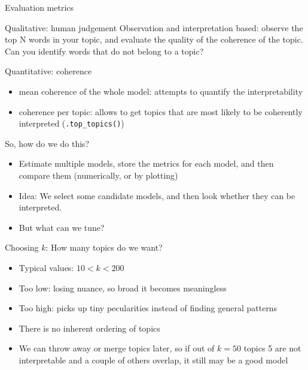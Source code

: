 \begin{frame}{Evaluation metrics}
	\begin{block}{Qualitative: human judgement}
		Observation and interpretation based: observe the top N words in your topic, and evaluate the quality of the coherence of the topic.  Can you identify words that do not belong to a topic?
	\end{block}
	
	\pause 
	\begin{block}{Quantitative: coherence}
		\begin{itemize}
			\item mean coherence of the whole model: attempts to quantify the interpretability
			\item coherence per topic: allows to get topics that are most likely to be coherently interpreted (\texttt{.top\_topics()})
		\end{itemize}
	\end{block}
	
\end{frame}


\begin{frame}{So, how do we do this?}
	\begin{itemize}[<+->]
		\item Estimate multiple models, store the metrics for each model, and then compare them (numerically, or by plotting)
		\item Idea: We select some candidate models, and then look whether they can be interpreted.
		\item But what can we tune?
	\end{itemize}
\end{frame}


\begin{frame}{Choosing $k$: How many topics do we want?}
	\begin{itemize}
		\item Typical values: $10<k<200$
		\item Too low: losing nuance, so broad it becomes meaningless
		\item Too high: picks up tiny pecularities instead of finding general patterns
		\item There is no inherent ordering of topics
		\item We can throw away or merge topics later, so if out of $k=50$ topics 5 are not interpretable and a couple of others overlap, it still may be a good model
	\end{itemize}
\end{frame}



